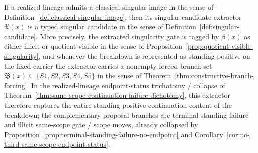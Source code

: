 \begin{lemma}\label{lem:singular-image-induces-typed-candidate}
If a realized lineage admits a classical singular image in the sense of Definition~\ref{def:classical-singular-image}, then its singular-candidate extractor $\mathfrak X(x)$ is a typed singular candidate in the sense of Definition~\ref{def:singular-candidate}. More precisely, the extracted singularity gate is tagged by $\beta(x)$ as either illicit or quotient-visible in the sense of Proposition~\ref{prop:quotient-visible-singularity}, and whenever the breakdown is represented as standing-positive on the fixed carrier the extractor carries a nonempty forced branch set $\mathfrak B(x)\subseteq\{S1,S2,S3,S4,S5\}$ in the sense of Theorem~\ref{thm:constructive-branch-forcing}. In the realized-lineage endpoint-status trichotomy / collapse of Theorem~\ref{thm:same-scope-continuation-failure-dichotomy}, this extractor therefore captures the entire standing-positive continuation content of the breakdown; the complementary proposal branches are terminal standing failure and illicit same-scope gate / scope moves, already collapsed by Proposition~\ref{prop:terminal-standing-failure-no-endpoint} and Corollary~\ref{cor:no-third-same-scope-endpoint-status}.
\end{lemma}

